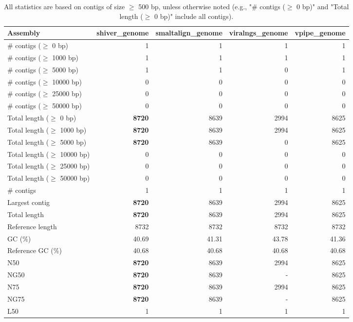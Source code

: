 \documentclass[12pt,a4paper]{article}
\begin{document}
\begin{table}[ht]
\begin{center}
\caption{All statistics are based on contigs of size $\geq$ 500 bp, unless otherwise noted (e.g., "\# contigs ($\geq$ 0 bp)" and "Total length ($\geq$ 0 bp)" include all contigs).}
\begin{tabular}{|l*{4}{|r}|}
\hline
Assembly & shiver\_genome & smaltalign\_genome & viralngs\_genome & vpipe\_genome \\ \hline
\# contigs ($\geq$ 0 bp) & 1 & 1 & 1 & 1 \\ \hline
\# contigs ($\geq$ 1000 bp) & 1 & 1 & 1 & 1 \\ \hline
\# contigs ($\geq$ 5000 bp) & 1 & 1 & 0 & 1 \\ \hline
\# contigs ($\geq$ 10000 bp) & 0 & 0 & 0 & 0 \\ \hline
\# contigs ($\geq$ 25000 bp) & 0 & 0 & 0 & 0 \\ \hline
\# contigs ($\geq$ 50000 bp) & 0 & 0 & 0 & 0 \\ \hline
Total length ($\geq$ 0 bp) & {\bf 8720} & 8639 & 2994 & 8625 \\ \hline
Total length ($\geq$ 1000 bp) & {\bf 8720} & 8639 & 2994 & 8625 \\ \hline
Total length ($\geq$ 5000 bp) & {\bf 8720} & 8639 & 0 & 8625 \\ \hline
Total length ($\geq$ 10000 bp) & 0 & 0 & 0 & 0 \\ \hline
Total length ($\geq$ 25000 bp) & 0 & 0 & 0 & 0 \\ \hline
Total length ($\geq$ 50000 bp) & 0 & 0 & 0 & 0 \\ \hline
\# contigs & 1 & 1 & 1 & 1 \\ \hline
Largest contig & {\bf 8720} & 8639 & 2994 & 8625 \\ \hline
Total length & {\bf 8720} & 8639 & 2994 & 8625 \\ \hline
Reference length & 8732 & 8732 & 8732 & 8732 \\ \hline
GC (\%) & 40.69 & 41.31 & 43.78 & 41.36 \\ \hline
Reference GC (\%) & 40.68 & 40.68 & 40.68 & 40.68 \\ \hline
N50 & {\bf 8720} & 8639 & 2994 & 8625 \\ \hline
NG50 & {\bf 8720} & 8639 & - & 8625 \\ \hline
N75 & {\bf 8720} & 8639 & 2994 & 8625 \\ \hline
NG75 & {\bf 8720} & 8639 & - & 8625 \\ \hline
L50 & 1 & 1 & 1 & 1 \\ \hline

\end{tabular}
\end{center}
\end{table}
\end{document}
